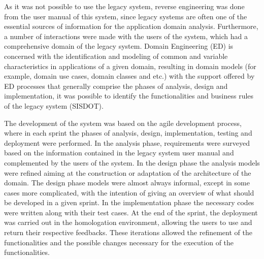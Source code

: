 \documentclass[twocolumn]{bmcart}%
\begin{document}
As it was not possible to use the legacy system, reverse engineering was done from the user manual of this system, since legacy systems are often one of the essential sources of information for the application domain analysis. Furthermore, a number of interactions were made with the users of the system, which had a comprehensive domain of the legacy system. Domain Engineering (ED) is concerned with the identification and modeling of common and variable characteristics in applications of a given domain, resulting in domain models (for example, domain use cases, domain classes and etc.) with the support offered by ED processes that generally comprise the phases of analysis, design and implementation, it was possible to identify the functionalities and business rules of the legacy system (SISDOT).


The development of the system was based on the agile development process, where in each sprint the phases of analysis, design, implementation, testing and deployment were performed. In the analysis phase, requirements were surveyed based on the information contained in the legacy system user manual and complemented by the users of the system. In the design phase the analysis models were refined aiming at the construction or adaptation of the architecture of the domain. The design phase models were almost always informal, except in some cases more complicated, with the intention of giving an overview of what should be developed in a given sprint. In the implementation phase the necessary codes were written along with their test cases. At the end of the sprint, the deployment was carried out in the homologation environment, allowing the users to use and return their respective feedbacks. These iterations allowed the refinement of the functionalities and the possible changes necessary for the execution of the functionalities.
\end{document}
